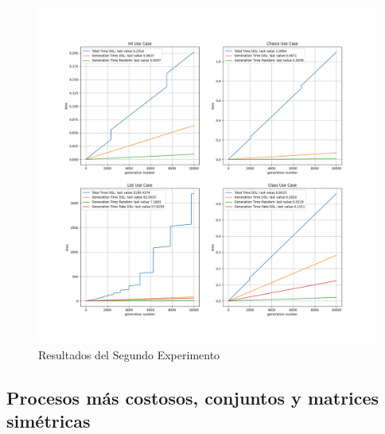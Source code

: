 \begin{figure}[!ht]
      \includegraphics[width=\linewidth]{Graphics/exp2.png}
      \caption{Resultados del Segundo Experimento}
      \label{fig:exp_2}
\end{figure}

\subsection*{Procesos más costosos, conjuntos y matrices simétricas}

